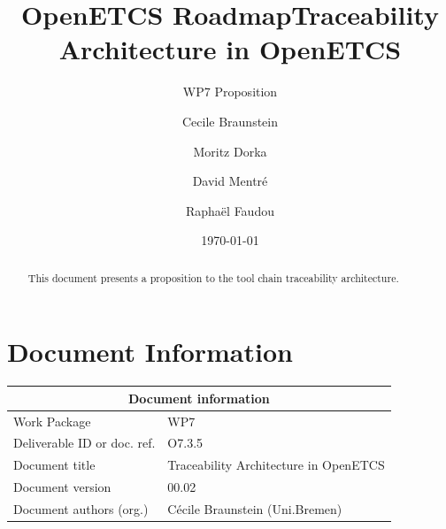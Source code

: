 \documentclass[11pt]{template/openetcs_report}
\begin{document}
\frontmatter
{}




\title{OpenETCS Roadmap}




\date{\today}
\title{Traceability Architecture in OpenETCS}
\subtitle{WP7 Proposition}

\techassessorname{}
\techassessoraffil{}

\qualityassessorname{}
\qualityassessoraffil{}

\approvalname{}
\approvalaffil{}
\author{Cecile Braunstein}

\author{Moritz Dorka}

\author{David Mentré}

\author{Raphaël Faudou}





\begin{abstract}
This document presents a proposition to the tool chain traceability
architecture.
\end{abstract}


\maketitle
\tableofcontents

\newpage

\chapter{Document Information}

\begin{tabular}{|p{4.4cm}|p{8.7cm}|}
\hline
\multicolumn{2}{|c|}{Document information} \\
\hline
Work Package &  WP7  \\
Deliverable ID or doc. ref. & O7.3.5\\
\hline
Document title &Traceability Architecture in OpenETCS \\
Document version & 00.02 \\
Document authors (org.)  & Cécile Braunstein (Uni.Bremen) \\
\hline
\end{tabular}
\end{document}
